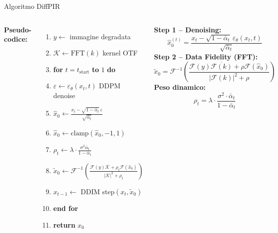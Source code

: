 \documentclass[italian,10pt]{beamer}
\begin{document}
\begin{frame}{Algoritmo DiffPIR}
  \begin{columns}
      \small
      \textbf{Pseudo-codice:}
      \vspace{0.1cm}
      \begin{enumerate}
        \item $y \gets$ immagine degradata
        \item $\mathcal{K} \gets \text{FFT}(k)$ \hfill\tiny kernel OTF
        \item \textbf{for} $t = t_{\text{start}}$ \textbf{to} $1$ \textbf{do}
        \item \hspace{0.5cm}$\varepsilon \gets \varepsilon_\theta(x_t, t)$ \hfill\tiny DDPM denoise
        \item \hspace{0.5cm}$\hat{x}_0 \gets \frac{x_t - \sqrt{1-\bar{\alpha}_t}\,\varepsilon}{\sqrt{\bar{\alpha}_t}}$
        \item \hspace{0.5cm}$\hat{x}_0 \gets \text{clamp}(\hat{x}_0, -1, 1)$
        \item \hspace{0.5cm}$\rho_t \gets \lambda \cdot \frac{\sigma^2 \bar{\alpha}_t}{1 - \bar{\alpha}_t}$
        \item \hspace{0.5cm}$\tilde{x}_0 \gets \mathcal{F}^{-1}\!\left(\frac{\mathcal{F}(y)\overline{\mathcal{K}} + \rho_t\mathcal{F}(\hat{x}_0)}{|\mathcal{K}|^2 + \rho_t}\right)$
        \item \hspace{0.5cm}$x_{t-1} \gets$ DDIM step$(x_t, \tilde{x}_0)$
        \item \textbf{end for}
        \item \textbf{return} $x_0$
      \end{enumerate}
      \small
      \textbf{Step 1 -- Denoising:}
      \begin{equation*}
        \hat{x}_0^{(t)} = \frac{x_t - \sqrt{1-\bar{\alpha}_t}\,\varepsilon_\theta(x_t,t)}{\sqrt{\bar{\alpha}_t}}
      \end{equation*}
      \vspace{0.15cm}
      \textbf{Step 2 -- Data Fidelity (FFT):}
      \begin{equation*}
        \tilde{x}_0 = \mathcal{F}^{-1}\!\left(
        \frac{\mathcal{F}(y)\overline{\mathcal{F}(k)} + \rho\mathcal{F}(\hat{x}_0)}
             {|\mathcal{F}(k)|^2 + \rho}\right)
      \end{equation*}
      \vspace{0.15cm}
      \textbf{Peso dinamico:}
      \begin{equation*}
        \rho_t = \lambda \cdot \frac{\sigma^2 \cdot \bar{\alpha}_t}{1 - \bar{\alpha}_t}
      \end{equation*}
  \end{columns}
\end{frame}
\end{document}
